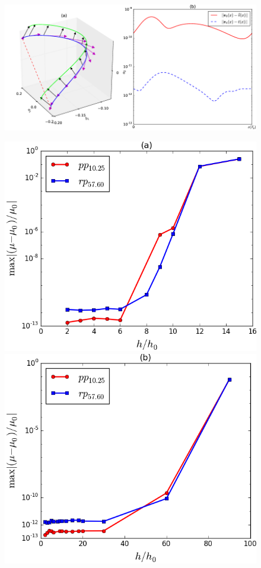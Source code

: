 \documentclass[mathserif, handout]{beamer}
\begin{document}
\begin{frame}[allowframebreaks]
  \begin{figure}[h]
    \centering
    \includegraphics[width=1.0\linewidth]{ppo1vectfield}
    \label{fig:ppo1vectorfield}
  \end{figure}

  \begin{figure}[h]
    \centering
    \includegraphics[width=0.47\linewidth]{ppo1FEerror} \hfill
    \includegraphics[width=0.47\linewidth]{rpo22FEerror}
    \label{fig:FEerror}
  \end{figure}

\end{frame}
\end{document}
